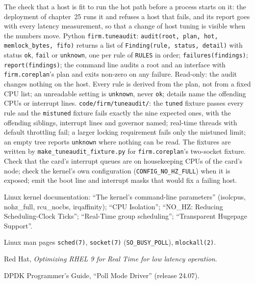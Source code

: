 \begin{build}
 The check that a host is fit to run the hot path before a process starts on it: the deployment of chapter~25
runs it and refuses a host that fails, and its report goes with every latency measurement, so that a change of host tuning is
visible when the numbers move.
 Python \texttt{firm.tuneaudit}: \texttt{audit(root, plan, hot, memlock\_bytes, fifo)} returns a list of
\texttt{Finding(rule, status, detail)} with status \texttt{ok}, \texttt{fail} or \texttt{unknown}, one per rule of
\texttt{RULES} in order; \texttt{failures(findings)}; \texttt{report(findings)}; the command line audits a root and an interface
with \texttt{firm.coreplan}'s plan and exits non-zero on any failure.
 Read-only: the audit changes nothing on the host. Every rule is derived from the plan, not from a fixed CPU list;
an unreadable setting is \texttt{unknown}, never \texttt{ok}; details name the offending CPUs or interrupt lines.
 \texttt{code/firm/tuneaudit/}: the \texttt{tuned} fixture passes every rule and the
\texttt{mistuned} fixture fails exactly the nine expected ones, with the offending siblings, interrupt lines and governor named;
real-time threads with default throttling fail; a larger locking requirement fails only the mistuned limit; an empty tree reports
\texttt{unknown} where nothing can be read. The fixtures are written by \texttt{make\_tuneaudit\_fixture.py} for
\texttt{firm.coreplan}'s two-socket fixture.
 Check that the card's interrupt queues are on housekeeping CPUs of the card's node; check the kernel's own
configuration (\texttt{CONFIG\_NO\_HZ\_FULL}) when it is exposed; emit the boot line and interrupt masks that would fix a
failing host.
\end{build}

\begin{omsources}
\item Linux kernel documentation: ``The kernel's command-line parameters'' (isolcpus, nohz\_full, rcu\_nocbs,
irqaffinity); ``CPU Isolation''; ``NO\_HZ: Reducing Scheduling-Clock Ticks''; ``Real-Time group scheduling'';
``Transparent Hugepage Support''.
\item Linux man pages \texttt{sched(7)}, \texttt{socket(7)} (\texttt{SO\_BUSY\_POLL}), \texttt{mlockall(2)}.
\item Red Hat, \emph{Optimizing RHEL 9 for Real Time for low latency operation}.
\item DPDK Programmer's Guide, ``Poll Mode Driver'' (release 24.07).
\end{omsources}

